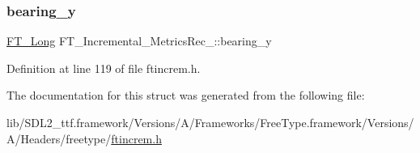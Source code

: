 \subsubsection{\texorpdfstring{bearing\_y}{bearing\_y}}
{\footnotesize\ttfamily \mbox{\hyperlink{fttypes_8h_a7fa72a1f0e79fb1860c5965789024d6f}{F\+T\+\_\+\+Long}} F\+T\+\_\+\+Incremental\+\_\+\+Metrics\+Rec\+\_\+\+::bearing\+\_\+y}



Definition at line 119 of file ftincrem.\+h.



The documentation for this struct was generated from the following file\+:\begin{DoxyCompactItemize}
\item 
lib/\+S\+D\+L2\+\_\+ttf.\+framework/\+Versions/\+A/\+Frameworks/\+Free\+Type.\+framework/\+Versions/\+A/\+Headers/freetype/\mbox{\hyperlink{ftincrem_8h}{ftincrem.\+h}}\end{DoxyCompactItemize}

